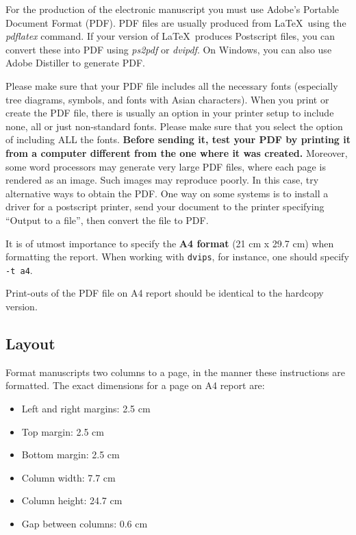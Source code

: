 \documentclass[11pt]{article}
\begin{document}
For the production of the electronic manuscript you must use Adobe's
Portable Document Format (PDF). PDF files are usually produced from
\LaTeX\ using the \textit{pdflatex} command. If your version of
\LaTeX\ produces Postscript files, you can convert these into PDF
using \textit{ps2pdf} or \textit{dvipdf}. On Windows, you can also use
Adobe Distiller to generate PDF.

Please make sure that your PDF file includes all the necessary fonts
(especially tree diagrams, symbols, and fonts with Asian
characters). When you print or create the PDF file, there is usually
an option in your printer setup to include none, all or just
non-standard fonts.  Please make sure that you select the option of
including ALL the fonts. \textbf{Before sending it, test your PDF by
  printing it from a computer different from the one where it was
  created.} Moreover, some word processors may generate very large PDF
files, where each page is rendered as an image. Such images may
reproduce poorly. In this case, try alternative ways to obtain the
PDF. One way on some systems is to install a driver for a postscript
printer, send your document to the printer specifying ``Output to a
file'', then convert the file to PDF.

It is of utmost importance to specify the \textbf{A4 format} (21 cm
x 29.7 cm) when formatting the report. When working with
{\tt dvips}, for instance, one should specify {\tt -t a4}.

Print-outs of the PDF file on A4 report should be identical to the
hardcopy version.


\subsection{Layout}
\label{ssec:layout}

Format manuscripts two columns to a page, in the manner these
instructions are formatted. The exact dimensions for a page on A4
report are:

\begin{itemize}
\item Left and right margins: 2.5 cm
\item Top margin: 2.5 cm
\item Bottom margin: 2.5 cm
\item Column width: 7.7 cm
\item Column height: 24.7 cm
\item Gap between columns: 0.6 cm
\end{itemize}
\end{document}
